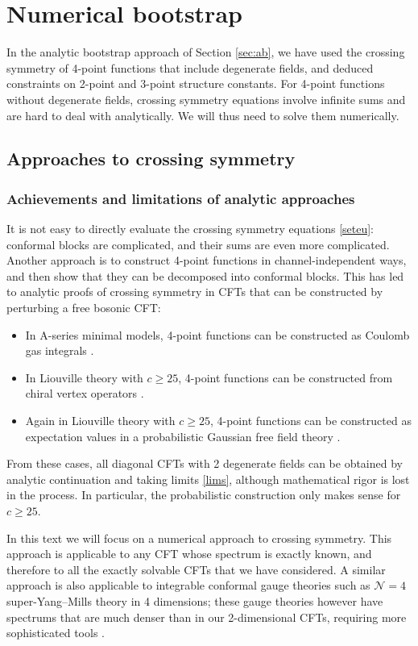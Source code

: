 \documentclass[12pt, a4paper]{article}
\theoremstyle{break}
\begin{document}
\section{Numerical bootstrap}

In the analytic bootstrap approach of Section \ref{sec:ab}, we have used the crossing symmetry of 4-point functions that include degenerate fields, and deduced constraints on 2-point and 3-point structure constants. For 4-point functions without degenerate fields, crossing symmetry equations involve infinite sums and are hard to deal with analytically. We will thus need to solve them numerically. 

\subsection{Approaches to crossing symmetry}

\subsubsection{Achievements and limitations of analytic approaches}

It is not easy to directly evaluate the crossing symmetry equations \eqref{seteu}: conformal blocks are complicated, and their sums are even more complicated. Another approach is to construct 4-point functions in channel-independent ways, and then show that they can be decomposed into conformal blocks. This has led to analytic proofs of crossing symmetry in CFTs that can be constructed by perturbing a free bosonic CFT:
\begin{itemize}
 \item In A-series minimal models, 4-point functions can be constructed as Coulomb gas integrals \cite{df84}.
 \item In Liouville theory with $c\geq 25$, 4-point functions can be constructed from chiral vertex operators \cite{tes03b}.
 \item Again in Liouville theory with $c\geq 25$, 4-point functions can be constructed as expectation values in a probabilistic Gaussian free field theory \cite{ckrv05}. 
\end{itemize}
From these cases, all diagonal CFTs with 2 degenerate fields can be obtained by analytic continuation and taking limits \eqref{lims}, although mathematical rigor is lost in the process. In particular, the probabilistic construction only makes sense for $c\geq 25$. 

In this text we will focus on a numerical approach to crossing symmetry. This approach is applicable to any CFT whose spectrum is exactly known, and therefore to all the exactly solvable CFTs that we have considered. 
A similar approach is also applicable to integrable conformal gauge theories such as $\mathcal{N}=4$ super-Yang--Mills theory in 4 dimensions; these gauge theories however have spectrums that are much denser than in our 2-dimensional CFTs, requiring more sophisticated tools \cite{cgjp22}.
\end{document}
